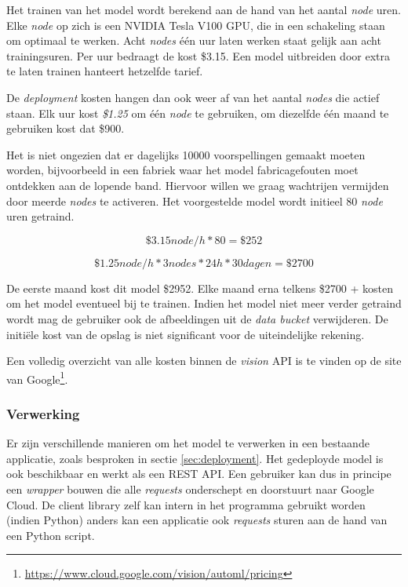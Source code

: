 Het trainen van het model wordt berekend aan de hand van het aantal \textit{node} uren. Elke \textit{node} op zich is een NVIDIA Tesla V100 GPU, die in een schakeling staan om optimaal te werken. Acht \textit{nodes} één uur laten werken staat gelijk aan acht trainingsuren. Per uur bedraagt de kost \$3.15. Een model uitbreiden door extra te laten trainen hanteert hetzelfde tarief.

De \textit{deployment} kosten hangen dan ook weer af van het aantal \textit{nodes} die actief staan. Elk uur kost \textit{\$1.25} om één \textit{node} te gebruiken, om diezelfde één maand te gebruiken kost dat \$900.

Het is niet ongezien dat er dagelijks 10000 voorspellingen gemaakt moeten worden, bijvoorbeeld in een fabriek waar het model fabricagefouten moet ontdekken aan de lopende band. Hiervoor willen we graag wachtrijen vermijden door meerde \textit{nodes} te activeren. Het voorgestelde model wordt initieel 80 \textit{node} uren getraind.

\begin{equation}
    \$3.15 node/h * 80 = \$252
\end{equation}

\begin{equation}
    \$1.25 node/h * 3 nodes * 24h * 30 dagen = \$2700
\end{equation}

De eerste maand kost dit model \$2952. Elke maand erna telkens \$2700 + kosten om het model eventueel bij te trainen. Indien het model niet meer verder getraind wordt mag de gebruiker ook de afbeeldingen uit de \textit{data bucket} verwijderen. De initiële kost van de opslag is niet significant voor de uiteindelijke rekening.

Een volledig overzicht van alle kosten binnen de \textit{vision} API is te vinden op de site van Google\footnote{\url{https://www.cloud.google.com/vision/automl/pricing}}.

\subsubsection{Verwerking}
\label{sucsubsec:google-nfr-verwerking}

Er zijn verschillende manieren om het model te verwerken in een bestaande applicatie, zoals besproken in sectie \ref{sec:deployment}. Het gedeployde model is ook beschikbaar en werkt als een REST API. Een gebruiker kan dus in principe een \textit{wrapper} bouwen die alle \textit{requests} onderschept en doorstuurt naar Google Cloud. De client library zelf kan intern in het programma gebruikt worden (indien Python) anders kan een applicatie ook \textit{requests} sturen aan de hand van een Python script. 